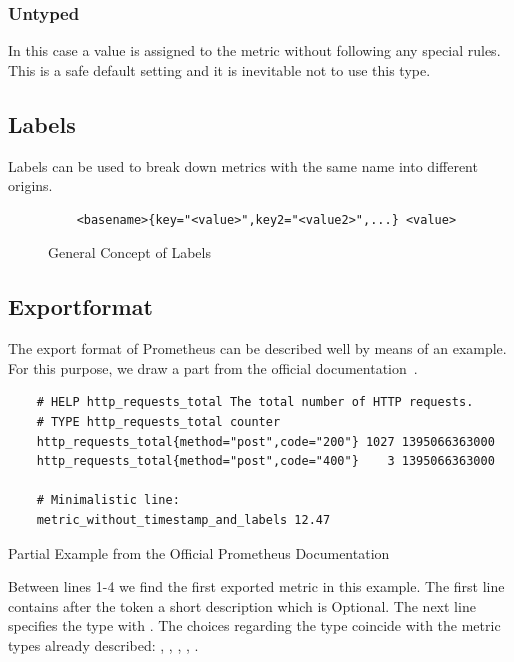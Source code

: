 \subsubsection{Untyped}
In this case a value is assigned to the metric without following any special rules. This is a safe default setting and it is inevitable not to use this type.
\subsection{Labels}
Labels can be used to break down metrics with the same name into different origins. 
\begin{figure}[!ht]
	\begin{verbatim}
	<basename>{key="<value>",key2="<value2>",...} <value>
	\end{verbatim}
	\caption{General Concept of Labels}
\end{figure}
\subsection{Exportformat}
\label{subsec:Exportformat}
The export format of Prometheus can be described well by means of an example. For this purpose, we draw a part from the official documentation~\cite{PrometheusExpositionFormatBeispiel}.\\
\par
\begin{listing}[H]
	\begin{verbatim}
	# HELP http_requests_total The total number of HTTP requests.
	# TYPE http_requests_total counter
	http_requests_total{method="post",code="200"} 1027 1395066363000
	http_requests_total{method="post",code="400"}    3 1395066363000
	
	# Minimalistic line:
	metric_without_timestamp_and_labels 12.47
	\end{verbatim}
	\caption{Partial Example from the Official Prometheus Documentation~\cite{PrometheusExpositionFormatBeispiel}}
\end{listing}
Between lines 1-4 we find the first exported metric in this example. The first line contains after the token  a short description which is Optional. The next line specifies the type with \linebreak {}. The choices regarding the type coincide with the metric types already described: , , , , .

